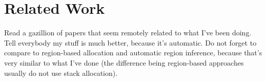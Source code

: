 
\chapter{Related Work}
	\label{chapter:rel}
	Read a gazillion of papers that seem remotely related to what I've been doing. Tell everybody my stuff is much better,
	because it's automatic. Do not forget to compare to region-based allocation and automatic region inference, because
	that's very similar to what I've done (the difference being region-based approaches usually do not use stack
	allocation).
